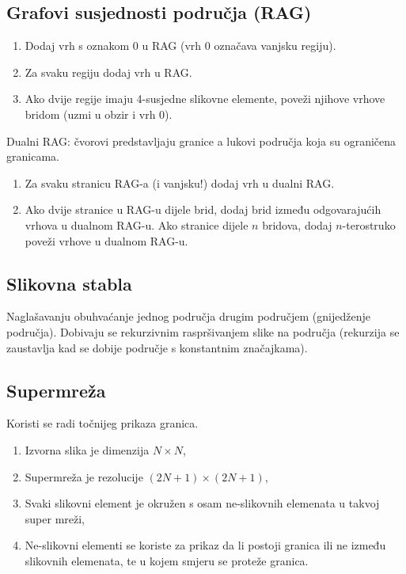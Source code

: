 \documentclass[11pt,english]{article}
\begin{document}
\subsection{Grafovi susjednosti područja (RAG)}
\begin{enumerate}
  \item Dodaj vrh s oznakom 0 u RAG (vrh 0 označava vanjsku regiju).
  \item Za svaku regiju dodaj vrh u RAG.
  \item Ako dvije regije imaju 4-susjedne slikovne elemente, poveži njihove vrhove bridom (uzmi u obzir i vrh 0).
\end{enumerate}
Dualni RAG: čvorovi predstavljaju granice a lukovi područja koja su ograničena granicama.
\begin{enumerate}
  \item Za svaku stranicu RAG-a (i vanjsku!) dodaj vrh u dualni RAG.
  \item Ako dvije stranice u RAG-u dijele brid, dodaj brid između odgovarajućih vrhova u dualnom RAG-u. Ako stranice dijele $n$ bridova, dodaj $n$-terostruko poveži vrhove u dualnom RAG-u.
\end{enumerate}

\subsection{Slikovna stabla}
Naglašavanju obuhvaćanje jednog područja drugim područjem (gnijedženje područja). Dobivaju se rekurzivnim raspršivanjem slike na područja (rekurzija se zaustavlja kad se dobije područje s konstantnim značajkama).

\subsection{Supermreža}
Koristi se radi točnijeg prikaza granica.
\begin{enumerate}
  \item Izvorna slika je dimenzija $N \times N$,
  \item Supermreža je rezolucije $(2N+1) \times (2N+1)$,
  \item Svaki slikovni element je okružen s osam ne-slikovnih elemenata u takvoj super mreži,
  \item Ne-slikovni elementi se koriste za prikaz da li postoji granica ili ne između slikovnih elemenata, te u kojem smjeru se proteže granica.
\end{enumerate}
\end{document}

